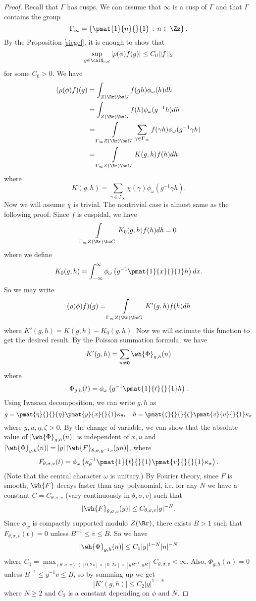 \documentclass{article}
\begin{document}
\begin{proof}
Recall that $\Gamma$ has cusps. We can assume that $\infty$ is a cusp of $\Gamma$ and that $\Gamma$ contains the group 
$$
\Gamma_{\infty} = \left\{ \pmat{1}{n}{}{1} \,:\, n\in \Zz\right\}.
$$
By the Proposition \ref{siegel}, it is enough to show that 
$$
\sup_{g\in \calG_{c, d}}|\rho(\phi)f(g)| \leq C_{0}||f||_{2}
$$
for some $C_{0} >0$. We have
\begin{align*}
(\rho(\phi)f)(g) &= \int_{Z(\Rr)\bs G} f(gh)\phi_{\omega}(h) dh \\
&= \int_{Z(\Rr)\bs G} f(h) \phi_{\omega}(g^{-1}h)dh \\
&= \int\limits_{\Gamma_{\infty} Z(\Rr)\bs G} \sum_{\gamma\in \Gamma_{\infty}} f(\gamma h)\phi_{\omega}(g^{-1}\gamma h) \\
&= \int\limits_{\Gamma_{\infty} Z(\Rr)\bs G} K(g, h) f(h) dh
\end{align*}
where 
$$
K(g, h) = \sum_{\gamma\in \Gamma_{\infty}} \chi(\gamma) \phi_{\omega}(g^{-1}\gamma h). 
$$
Now we will assume $\chi$ is trivial. The nontrivial case is almost same as the following proof.
Since $f$ is cuspidal, we have 
$$
\int\limits_{\Gamma_{\infty} Z(\Rr)\bs G} K_{0}(g, h) f(h) dh = 0
$$
where we define
$$
K_{0}(g, h) = \int_{-\infty}^{\infty} \phi_{\omega} \left( g^{-1} \pmat{1}{x}{}{1} h\right) dx.
$$
So we may write 
$$
(\rho(\phi)f)(g) = \int\limits_{\Gamma_{\infty} Z(\Rr)\bs G} K'(g, h) f(h) dh
$$
where $K'(g, h) = K(g, h) - K_{0}(g, h)$. Now we will estimate this function to get the desired result. 
By the Poisson summation formula, we have
$$
K'(g, h) = \sum_{n\neq 0} \wh{\Phi}_{g, h}(n)
$$
where 
$$
\Phi_{g, h}(t) = \phi_{\omega} \left( g^{-1} \pmat{1}{t}{}{1} h\right). 
$$
Using Iwasasa decomposition, we can write $g, h$ as 
$$
g = \pmat{\eta}{}{}{\eta}\pmat{y}{x}{}{1} \kappa_{\theta}, \quad h = \pmat{\zeta}{}{}{\zeta}\pmat{v}{u}{}{1} \kappa_{\sigma}
$$
where $y, u, \eta, \zeta > 0$. By the change of variable, we can show that the absolute value of $|\wh{\Phi}_{g, h}(n)|$ is  independent of $x, u$ and $|\wh{\Phi}_{g, h} (n)| = |y|\,|\wh{F}_{\theta, \sigma, y^{-1}v}(yn)|$, where 
$$
F_{\theta, \sigma, v}(t) = \phi_{\omega} \left( \kappa_{\theta}^{-1} \pmat{1}{t}{}{1} \pmat{v}{}{}{1} \kappa_{\sigma}\right). 
$$
(Note that the central character $\omega$ is unitary.)
By Fourier theory, since $F$ is smooth, $\wh{F}$ decays faster than any polynomial, i.e. for any $N$ we have a constant $C = C_{\theta, \sigma, v}$ (vary continuously in $\theta, \sigma, v$) such that 
$$
|\wh{F}_{\theta, \sigma, v}(y)| \leq C_{\theta, \sigma, v}|y|^{-N}.
$$
Since $\phi_{w}$ is compactly supported modulo $Z(\Rr)$, there exists $B>1$ such that $F_{\theta, \sigma, v}(t) = 0$ unless $B^{-1} \leq v \leq B$.  So we have 
$$
|\wh{\Phi}_{g, h}(n)| \leq C_{1} |y|^{1-N}|n|^{-N}
$$
where $C_{1} = \max_{(\theta, \sigma, v)\in [0, 2\pi]\times [0, 2\pi] \times [yB^{-1}, yB]} C_{\theta, \sigma, v} < \infty$. 
Also, $\Phi_{g, h}(n) = 0$ unless $B^{-1} \leq y^{-1}v \leq B$, so by summing up we get
$$
|K'(g, h)| \leq C_{2} |y|^{1-N}
$$
where $N\geq 2$ and $C_{2}$ is a constant depending on $\phi$ and $N$. 


\end{proof}
\end{document}
